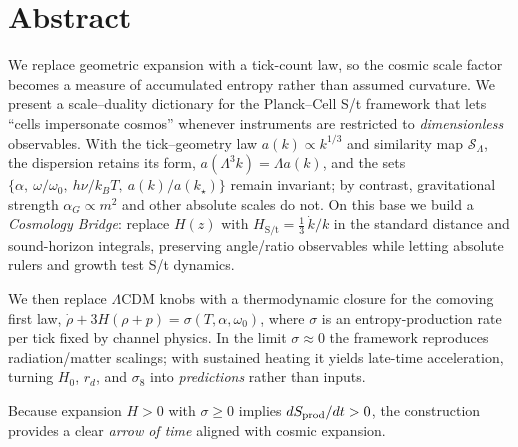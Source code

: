 \section*{Abstract}
We replace geometric expansion with a tick-count law, so the cosmic scale factor becomes a measure of accumulated entropy rather than assumed curvature.
We present a scale--duality dictionary for the Planck--Cell S/t framework that lets ``cells impersonate cosmos'' whenever instruments are restricted to \emph{dimensionless} observables. With the tick--geometry law $a(k)\propto k^{1/3}$ and similarity map $\mathcal S_\Lambda$, the dispersion retains its form, $a(\Lambda^3k)=\Lambda a(k)$, and the sets $\{\alpha,\ \omega/\omega_0,\ h\nu/k_BT,\ a(k)/a(k_\star)\}$ remain invariant; by contrast, gravitational strength $\alpha_G\propto m^2$ and other absolute scales do not. On this base we build a \emph{Cosmology Bridge}: replace $H(z)$ with $H_{\text{S/t}}=\tfrac13\,\dot k/k$ in the standard distance and sound-horizon integrals, preserving angle/ratio observables while letting absolute rulers and growth test S/t dynamics.


We then replace $\Lambda$CDM knobs with a thermodynamic closure for the comoving first law, $\dot\rho+3H(\rho+p)=\sigma(T,\alpha,\omega_0)$, where $\sigma$ is an entropy-production rate per tick fixed by channel physics. In the limit $\sigma\approx 0$ the framework reproduces radiation/matter scalings; with sustained heating it yields late-time acceleration, turning $H_0$, $r_d$, and $\sigma_8$ into \emph{predictions} rather than inputs.

\vspace{0.5\baselineskip}

Because expansion $H>0$ with $\sigma\ge 0$ implies $dS_{\rm prod}/dt>0$, the construction provides a clear \emph{arrow of time} aligned with cosmic expansion.
